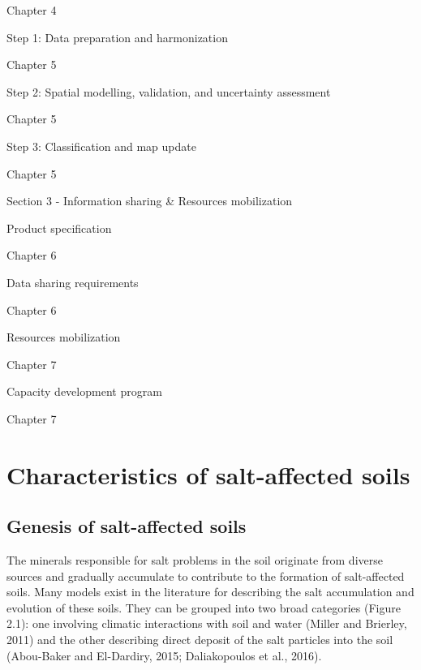 \documentclass[
  10pt,
  b5paper,
]{book}
\begin{document}
Chapter 4

Step 1: Data preparation and harmonization

Chapter 5

Step 2: Spatial modelling, validation, and uncertainty assessment

Chapter 5

Step 3: Classification and map update

Chapter 5

Section 3 - Information sharing \& Resources mobilization

Product specification

Chapter 6

Data sharing requirements

Chapter 6

Resources mobilization

Chapter 7

Capacity development program

Chapter 7

\hypertarget{characteristics-of-salt-affected-soils}{%
\chapter{Characteristics of salt-affected soils}\label{characteristics-of-salt-affected-soils}}

\hypertarget{genesis-of-salt-affected-soils}{%
\section{Genesis of salt-affected soils}\label{genesis-of-salt-affected-soils}}

The minerals responsible for salt problems in the soil originate from diverse sources and gradually accumulate to contribute to the formation of salt-affected soils. Many models exist in the literature for describing the salt accumulation and evolution of these soils. They can be grouped into two broad categories (Figure 2.1): one involving climatic interactions with soil and water (Miller and Brierley, 2011) and the other describing direct deposit of the salt particles into the soil (Abou-Baker and El-Dardiry, 2015; Daliakopoulos et al., 2016).
\end{document}
